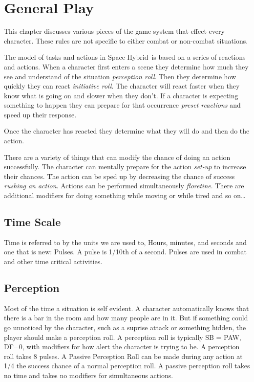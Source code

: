 \chapter{General Play}

This chapter discusses various pieces of the game system that effect 
every character. These rules are not specific to either combat or 
non-combat situations.  

The model of tasks and actions in Space Hybrid\ is based on a series of 
reactions and actions. When a character first enters a scene
they determine how much they see and understand of the situation {\em 
perception roll}. Then they determine how quickly they can react {\em 
initiative roll}. The character will react faster when they know what 
is going on and slower when they don't. If a character is expecting 
something to happen they can prepare for that occurrence {\em preset 
reactions} and speed up their response. 

Once the character has reacted they determine what they will do and then 
do the action. 

There are a variety of things that can modify the chance of doing an 
action successfully. The character can mentally prepare for the 
action {\em set-up} to increase their chances. The action can be sped 
up by decreasing the chance of success {\em rushing an action}. 
Actions can be performed simultaneously {\em floretine}. There are 
additional modifiers for doing something while moving or while tired 
and so on\dots

\section{Time Scale}

Time is referred to by the units we are used to, Hours, minutes, and seconds 
and one that is new: Pulses. A {pulse} is 1/10th of a second. Pulses are
used in combat and other time critical activities.

\section{Perception}

Most of the time a situation is self evident. A character automatically
knows that there is a bar in the room and how many people are in it.
But if something could go unnoticed by the character, such as a suprise 
attack or something hidden, the player should make a {perception roll}. 
A perception roll is typically SB = PAW, DF=0, with modifiers for 
how alert the character is trying to be. A perception roll takes
8 pulses. A {Passive Perception Roll} can be made 
during any action at 1/4 the success chance of a normal perception roll. A
passive perception roll takes no time and takes no modifiers for 
simultaneous actions.

